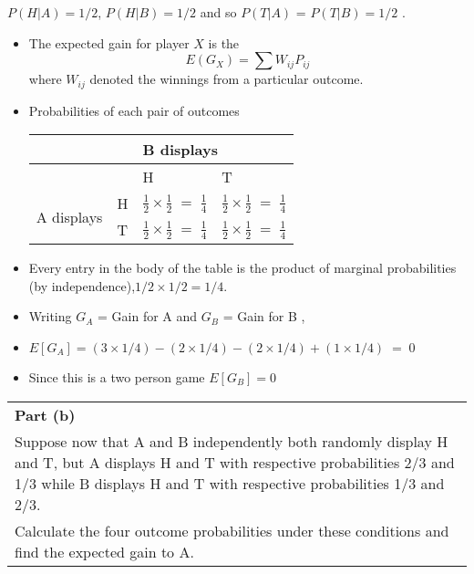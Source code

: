 \documentclass[a4paper,12pt]{article}
\begin{document}
	$P(H|A) = 1/2$, $P(H|B) = 1/2$ and so $P(T|A)$ = $P(T|B) = 1/2$ .
	\begin{itemize}
		
		\item The expected gain for player $X$ is the 
		\[ E(G_{X}) = \sum W_{ij} P_{ij} \]
		where $W_{ij}$ denoted the winnings from a particular outcome.
		
		\item Probabilities of each pair of outcomes
		
		
		\begin{center}
			\begin{tabular}{|ll|l|l|}\hline
				\multicolumn{2}{|l}{}   & \multicolumn{2}{l|}{B displays} \\ \hline
				\multicolumn{2}{|l|}{}   & H      & T      \\ \hline 
				\multirow{2}{*}{A displays} & H  &  $\frac{1}{2} \times \frac{1}{2}  \;=\; \frac{1}{4}$ & $\frac{1}{2} \times \frac{1}{2}  \;=\; \frac{1}{4}$ \\ 
				&  T &  $\frac{1}{2} \times \frac{1}{2}  \;=\; \frac{1}{4}$ & $\frac{1}{2} \times \frac{1}{2}  \;=\; \frac{1}{4}$ \\ \hline \end{tabular}
		\end{center}
		
		\item Every entry in the body of the table is the product of marginal probabilities (by
		independence),$1/2 \times 1/2 = 1/4$.
		
		\item Writing $G_A$ = Gain for A and $G_B$ = Gain for B ,
		\item $E[G_A] = (3 \times 1/4) - (2 \times 1/4) - (2 \times 1/4) + (1 \times 1/4) \;=\; 0 $
		\item Since this is a two person game $E[G_B] = 0$
	\end{itemize} 
	\newpage
	
	\begin{table}[ht!]
		\centering
		\begin{tabular}{|p{15cm}|}
			\hline  
			\noindent \textbf{Part (b)} \\ \large 
			Suppose now that A and B independently both randomly display H and T, but A displays H and T with respective probabilities 2/3 and 1/3 while B displays H and T with respective probabilities 1/3 and 2/3. \\ \smallskip
			\large 
			Calculate the four outcome probabilities under these conditions and find the expected gain to A. 
			\\ \hline 
		\end{tabular}
	\end{table}
	
\end{document}
